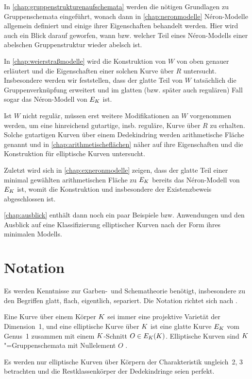 In \autoref{chap:gruppenstrukturenaufschemata} werden die nötigen
Grundlagen zu Gruppenschemata eingeführt, wonach dann in
\autoref{chap:neronmodelle} Néron-Modelle allgemein definiert und
einige ihrer Eigenschaften behandelt werden.
Hier wird auch ein Blick darauf geworfen, wann bzw. welcher Teil eines
Néron-Modells einer abelschen Gruppenstruktur wieder abelsch ist.

In \autoref{chap:weierstraßmodelle} wird die Konstruktion von $W$ von
oben genauer erläutert und die Eigenschaften einer solchen Kurve über
$R$ untersucht. Insbesondere werden wir feststellen, dass der glatte
Teil von $W$ tatsächlich die Gruppenverknüpfung erweitert und im
glatten (bzw. später auch regulären) Fall sogar das Néron-Modell von
$E_{K}$ ist.

Ist $W$ nicht regulär, müssen erst weitere Modifikationen an $W$
vorgenommen werden, um eine hinreichend gutartige, insb. reguläre,
Kurve über $R$ zu erhalten. Solche gutartigen Kurven über
einem Dedekindring werden arithmetische Fläche genannt und in
\autoref{chap:arithmetischeflächen} näher auf ihre Eigenschaften und
die Konstruktion für elliptische Kurven untersucht.

Zuletzt wird sich in \autoref{chap:exneronmodelle} zeigen, dass der
glatte Teil einer minimal gewählten arithmetischen Fläche zu $E_{K}$
bereits das Néron-Modell von $E_{K}$ ist, womit die Konstruktion und
insbesondere der Existenzbeweis abgeschlossen ist.

\autoref{chap:ausblick} enthält dann noch ein paar Beispiele
bzw. Anwendungen und den Ausblick auf eine Klassifizierung
elliptischer Kurven nach der Form ihres minimalen Modells.

\section*{Notation}
Es werden Kenntnisse zur Garben-~und Schematheorie benötigt,
insbesondere zu den Begriffen glatt, flach, eigentlich, separiert.
Die Notation richtet sich nach \cite{wedhorn}.

Eine Kurve über einem Körper $K$ sei immer eine projektive Varietät
der Dimension~1,
und eine elliptische Kurve über $K$ ist eine glatte Kurve $E_{K}$
vom Genus~1 zusammen mit einem $K$-Schnitt $O\in E_{K}(K)$.
Elliptische Kurven sind $K$"=Gruppenschemata mit Nullelement $O$
\cite{silverman}.

Es werden nur elliptische Kurven über Körpern der Charakteristik
ungleich~2, 3 betrachten und die Restklassenkörper der Dedekindringe
seien perfekt.

